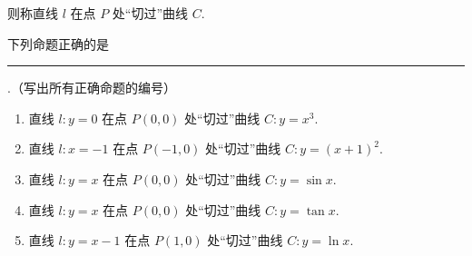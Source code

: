 \begin{description}
\begin{enumerate}[leftmargin=5pt]
则称直线 \(l\) 在点 \(P\) 处“切过”曲线 \(C\).

下列命题正确的是\rule[-0.3ex]{3em}{0.4pt}.（写出所有正确命题的编号）

\begin{enumerate}
\item 直线 \(l: y = 0\) 在点 \(P(0,0)\) 处“切过”曲线 \(C: y = x^3\).
\item 直线 \(l: x = -1\) 在点 \(P(-1,0)\) 处“切过”曲线 \(C: y = (x + 1)^2\).
\item 直线 \(l: y = x\) 在点 \(P(0,0)\) 处“切过”曲线 \(C: y = \sin x\).
\item 直线 \(l: y = x\) 在点 \(P(0,0)\) 处“切过”曲线 \(C: y = \tan x\).
\item 直线 \(l: y = x - 1\) 在点 \(P(1,0)\) 处“切过”曲线 \(C: y = \ln x\).
\end{enumerate}

    \end{enumerate}

\end{description}

